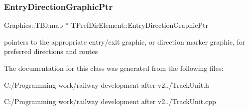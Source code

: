 \subsubsection{\texorpdfstring{Entry\+Direction\+Graphic\+Ptr}{EntryDirectionGraphicPtr}}
{\footnotesize\ttfamily Graphics\+::\+T\+Bitmap $\ast$ T\+Pref\+Dir\+Element\+::\+Entry\+Direction\+Graphic\+Ptr\hspace{0.3cm}{\ttfamily [protected]}}

pointers to the appropriate entry/exit graphic, or direction marker graphic, for preferred directions and routes 

The documentation for this class was generated from the following files\+:\begin{DoxyCompactItemize}
\item 
C\+:/\+Programming work/railway development after v2../Track\+Unit.\+h\item 
C\+:/\+Programming work/railway development after v2../Track\+Unit.\+cpp\end{DoxyCompactItemize}
